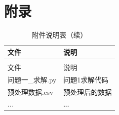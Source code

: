 \makeatletter
\let\@oldaddcontentsline\addcontentsline
\renewcommand{\addcontentsline}[3]{}
\section*{附录}
\let\addcontentsline\@oldaddcontentsline
\makeatother

\begin{longtable}{>{\raggedright\arraybackslash}p{}>{\centering\arraybackslash}p{}}
  \caption{附件说明表}
  \label{tab:appendix} \\
  \toprule
  文件 & 说明 \\
  \midrule
  \endfirsthead
  \caption{附件说明表（续）} \\
  \toprule
  文件 & 说明 \\
  \midrule
  \endhead
  \bottomrule
  \endfoot
  问题一\_求解.py & 问题1求解代码 \\
  预处理数据.csv & 预处理后的数据 \\
  ... & ... \\
\end{longtable}
